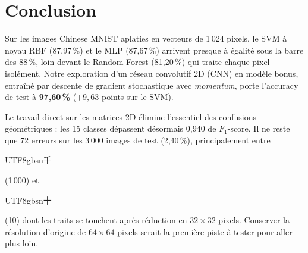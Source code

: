 \documentclass[10pt,a4paper]{article}
\newcommand{\zh}[1]{\begin{CJK}{UTF8}{gbsn}#1\end{CJK}}
\begin{document}
\section{Conclusion}\label{sec:concl}

Sur les images Chinese MNIST aplaties en vecteurs de 1\,024 pixels, le SVM à noyau RBF (87,97\,\%) et le MLP (87,67\,\%) arrivent presque à égalité sous la barre des 88\,\%, loin devant le Random Forest (81,20\,\%) qui traite chaque pixel isolément. Notre exploration d'un réseau convolutif 2D (CNN) en modèle bonus, entraîné par descente de gradient stochastique avec \emph{momentum}, porte l'accuracy de test à \textbf{97,60\,\%} ($+9{,}63$ points sur le SVM).

Le travail direct sur les matrices 2D élimine l'essentiel des confusions géométriques : les 15 classes dépassent désormais 0,940 de $F_1$-score. Il ne reste que 72 erreurs sur les 3\,000 images de test (2,40\,\%), principalement entre \zh{千} (1\,000) et \zh{十} (10) dont les traits se touchent après réduction en $32\times32$ pixels. Conserver la résolution d'origine de $64\times64$ pixels serait la première piste à tester pour aller plus loin.
\end{document}
